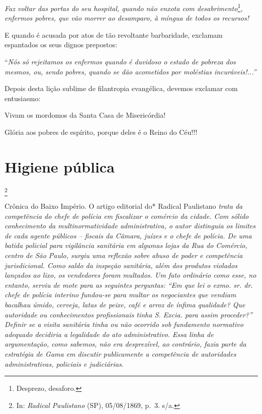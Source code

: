\emph{Faz voltar das portas do seu hospital, quando não enxota com
desabrimento}\footnote{Desprezo, desaforo.}\emph{,} \emph{enfermos
pobres, que vão morrer ao desamparo, à míngua de todos os recursos!}

E quando é acusada por atos de tão revoltante barbaridade, exclamam
espantados os seus dignos prepostos:

``\emph{Nós só rejeitamos os enfermos quando é duvidoso o estado de
pobreza dos mesmos, ou, sendo pobres, quando se dão acometidos por
moléstias incuráveis!...''}

Depois desta lição sublime de filantropia evangélica, devemos exclamar
com entusiasmo:

Vivam os mordomos da Santa Casa de Misericórdia!

Glória aos pobres de espírito, porque deles é o Reino do Céu!!!

\chapter{Higiene pública}\footnote{In: \emph{Radical Paulistano} (SP),
  05/08/1869, p.~3. s/a.}

\begin{didascalia}
Crônica do Baixo Império. O artigo editorial do* Radical Paulistano
\emph{trata da competência do chefe de polícia em fiscalizar o comércio
da cidade. Com sólido conhecimento da multinormatividade administrativa,
o autor distinguia os limites de cada agente públicos -- fiscais da
Câmara, juízes e o chefe de polícia. De uma batida policial para
vigilância sanitária em algumas lojas da Rua do Comércio, centro de São
Paulo, surgiu uma reflexão sobre abuso de poder e competência
jurisdicional. Como saldo da inspeção sanitária, além dos produtos
violados lançados ao lixo, os vendedores foram multados. Um fato
ordinário como esse, no entanto, serviu de mote para as seguintes
perguntas: ``Em que lei o exmo. sr. dr. chefe de polícia interino
fundou-se para multar os negociantes que vendiam bacalhau úmido,
cerveja, latas de peixe, café e arroz de ínfima qualidade? Que
autoridade ou conhecimentos profissionais tinha S. Excia. para assim
proceder?'' Definir se a visita sanitária tinha ou não ocorrido sob
fundamento normativo adequado decidiria a legalidade do ato
administrativo. Essa linha de argumentação, como sabemos, não era
desprezível, ao contrário, fazia parte da estratégia de Gama em discutir
publicamente a competência de autoridades administrativas, policiais e
judiciárias.}
\end{didascalia}

